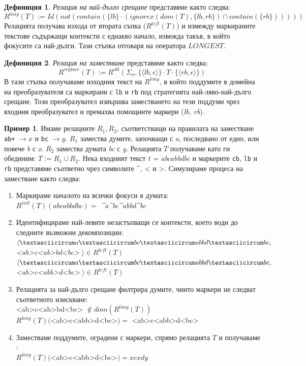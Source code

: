 \documentclass[12pt, oneside]{article}
\theoremstyle{definition}
\newtheorem{definition}{Дефиниция}[section]
\newtheorem{example}{Пример}[section]
\begin{document}
\begin{definition}\label{def:Rlong} \emph{Релация на най-дълго срещане} представяме както следва:
	\[ R^{long}(T) := Id(not(contain(\{lb\} \cdot (ignorex(dom(T), \{lb, rb\}) \cap contain(\{rb\}))))) \]
	Релацията получава изхода от втората съпка (\(R^{left}(T)\)) и измежду маркираните текстове съдържащи контексти с еднакво начало, извежда такъв, в който фокусите са най-дълги. Тази стъпка отговаря на оператора \(LONGEST\).
\end{definition}

\begin{definition}\label{def:Rreplace} \emph{Релация на заместване} представяме както следва:
	\[ R^{replace}(T) := R^{obl}(\Sigma_x, \{ \langle lb, \epsilon \rangle \} \cdot T \cdot \{ \langle rb, \epsilon \rangle \}) \]
	В тази стъпка получаваме изходния текст на \(R^{long}\), в който поддумите в домейна на преобразувателя са маркирани с \verb/lb/ и \verb/rb/ под стратегията най-ляво-най-дълго срещане. Този преобразувател извършва заместването на тези поддуми чрез входния преобразувател и премахва помощните маркери (\emph{lb, rb}).
\end{definition}

\begin{example}
	Имаме релациите \( R_1, R_2 \), съответстващи на правилата на заместване \verb/ab+/ \( \to x \) и \verb/bc/ \( \to y \). \(R_1\) замества думите, започващи с \emph{a}, последвано от едно, или повече \emph{b} с \emph{x}. \(R_2\) замества думата \emph{bc} с \emph{y}. Релацията \(T\) получаваме като ги обединим: \( T := R_1 \cup R_2 \). Нека входният текст \emph{t = abcabbdbc} и маркерите \verb/cb/, \verb/lb/ и \verb/rb/ представяме съответно чрез символите \textasciicircum, < и >. Симулираме процеса на заместване както следва:
	\begin{enumerate}
		\item Маркираме началото на всички фокуси в думата: \\ \( R^{init}(T)(abcabbdbc) = \) \emph{\textasciicircum a\textasciicircum bc\textasciicircum abbd\textasciicircum bc}
		\item Идентифицираме най-левите незастъпващи се контексти, което води до следните възможни декомпозиции: \\ 
		\( \langle \textasciicircum a\textasciicircum bc\textasciicircum abbd\textasciicircum bc,\) \emph{<ab>c<ab>bd<bc>} \(\rangle \in R^{left}(T) \) \\
		\( \langle \textasciicircum a\textasciicircum bc\textasciicircum abbd\textasciicircum bc,\) \emph{<ab>c<abb>d<bc>} \(\rangle \in R^{left}(T) \)
		\item Релацията за най-дълго срещане филтрира думите, чиито маркери не следват съответното изискване: \\
		<ab>c<ab>bd<bc> \( \notin dom(R^{long}(T)) \) \\
		\( R^{long}(T)(\)<ab>c<abb>d<bc>\() = \) <ab>c<abb>d<bc>
		\item Заместваме поддумите, оградени с маркери, спрямо релацията \(T\) и получаваме : \\
		\( R^{long}(T)(\)<ab>c<abb>d<bc>\() = xcxdy \)
	\end{enumerate}
\end{example}
\end{document}
